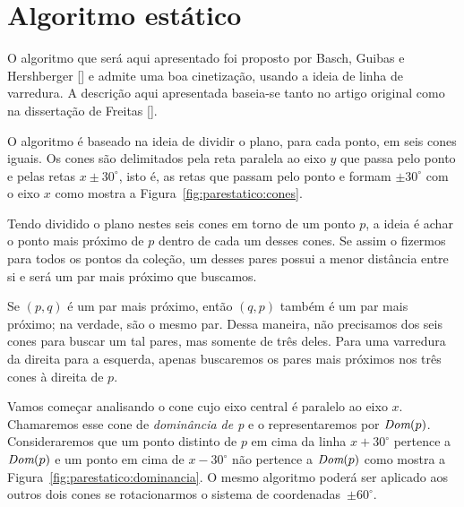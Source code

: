 
\FloatBarrier


\section{Algoritmo estático}\label{sec:algoritmo-estatico}

O algoritmo que será aqui apresentado foi proposto por Basch, Guibas
e Hershberger [\cite{BASCH19991}] e admite uma boa cinetização, usando a ideia de linha
de varredura.
A descrição aqui apresentada baseia-se tanto no artigo original como na dissertação de Freitas
[\cite{eduardo}].

O algoritmo é baseado na ideia de dividir o plano, para cada ponto, em seis cones iguais.
Os cones são delimitados pela reta paralela ao eixo $y$ que passa pelo ponto e pelas retas $x \pm
30^\circ$, isto é, as retas que passam pelo ponto e formam $\pm 30^\circ$ com o eixo $x$ como mostra a
Figura~\ref{fig:parestatico:cones}.



Tendo dividido o plano nestes seis cones em torno de um ponto $p$, a ideia é achar o ponto mais
próximo de $p$ dentro de cada um desses cones.
Se assim o fizermos para todos os pontos da coleção, um desses pares possui a menor distância
entre si e será um par mais próximo que buscamos.

Se $(p, q)$ é um par mais próximo, então $(q, p)$ também é um par mais próximo;
na verdade, são o mesmo par.
Dessa maneira, não precisamos dos seis cones para buscar um tal pares, mas somente de três deles.
Para uma varredura da direita para a esquerda, apenas buscaremos os pares mais próximos nos três
cones à direita de $p$.

Vamos começar analisando o cone cujo eixo central é paralelo ao eixo $x$.
Chamaremos esse cone de \textit{dominância de p} e o representaremos por $\textit{Dom}(p)$.
Consideraremos que um ponto distinto de $p$ em cima da linha $x + 30^\circ$ pertence a $\textit{Dom}(p)$ e um
ponto em cima de $x - 30^\circ$ não pertence a $\textit{Dom}(p)$ como mostra a
Figura~\ref{fig:parestatico:dominancia}.
O mesmo algoritmo poderá ser aplicado aos outros dois cones se rotacionarmos o sistema de
coordenadas~$\pm 60^\circ$.



